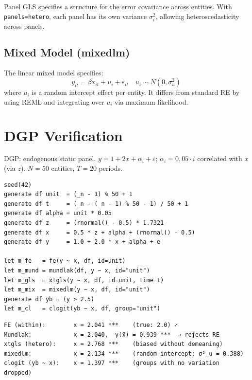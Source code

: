 Panel GLS specifies a structure for the error covariance across
entities. With \texttt{panels=hetero}, each panel has its own variance
$\sigma_i^2$, allowing heteroscedasticity across panels.

\subsection*{Mixed Model (mixedlm)}

The linear mixed model specifies:
\[
  y_{it} = \beta x_{it} + u_i + \varepsilon_{it} \quad u_i \sim N(0, \sigma_u^2)
\]
where $u_i$ is a random intercept effect per entity. It differs from standard RE
by using REML and integrating over $u_i$ via maximum likelihood.

\section{DGP Verification}

DGP: endogenous static panel. $y = 1 + 2x + \alpha_i + \varepsilon$;
$\alpha_i = 0{,}05 \cdot i$ correlated with $x$ (via $z$).
$N = 50$ entities, $T = 20$ periods.

\begin{lstlisting}[caption={Panel II: FE, Mundlak, xtgls, mixedlm, clogit}]
seed(42)
generate df unit  = (_n - 1) % 50 + 1
generate df t     = (_n - (_n - 1) % 50 - 1) / 50 + 1
generate df alpha = unit * 0.05
generate df z     = (rnormal() - 0.5) * 1.7321
generate df x     = 0.5 * z + alpha + (rnormal() - 0.5)
generate df y     = 1.0 + 2.0 * x + alpha + e

let m_fe   = fe(y ~ x, df, id=unit)
let m_mund = mundlak(df, y ~ x, id="unit")
let m_gls  = xtgls(y ~ x, df, id=unit, time=t)
let m_mix  = mixedlm(y ~ x, df, id="unit")
generate df yb = (y > 2.5)
let m_cl   = clogit(yb ~ x, df, group="unit")
\end{lstlisting}

\begin{lstlisting}[language={}, basicstyle=\ttfamily\small, frame=none,
  numbers=none, backgroundcolor=\color{codbg}]
FE (within):        x = 2.041 ***    (true: 2.0) ✓
Mundlak:            x = 2.040,  γ(x̄) = 0.939 ***  → rejects RE
xtgls (hetero):     x = 2.768 ***    (biased without demeaning)
mixedlm:            x = 2.134 ***    (random intercept: σ²_u = 0.388)
clogit (yb ~ x):    x = 1.397 ***    (groups with no variation dropped)
\end{lstlisting}

